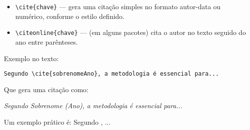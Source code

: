 \begin{itemize}
    \item \texttt{\textbackslash cite\{chave\}} — gera uma citação simples no formato autor-data ou numérico, conforme o estilo definido.
    \item \texttt{\textbackslash citeonline\{chave\}} — (em alguns pacotes) cita o autor no texto seguido do ano entre parênteses.
\end{itemize}

Exemplo no texto:

\begin{verbatim}
Segundo \cite{sobrenomeAno}, a metodologia é essencial para...
\end{verbatim}

Que gera uma citação como:

\textit{Segundo Sobrenome (Ano), a metodologia é essencial para...}

Um exemplo prático é: Segundo \cite{Knuth_1986_texbook}, ...